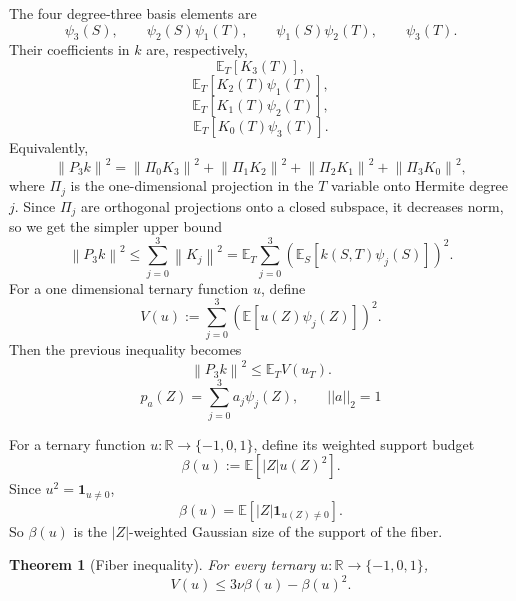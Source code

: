 \documentclass[11pt]{article}
\newtheorem{theorem}{Theorem}[section]
\newcommand{\R}{\mathbb R}
\newcommand{\E}{\mathbb E}
\newcommand{\norm}[1]{\left\|#1\right\|}
\newcommand{\one}{\mathbf 1}
\begin{document}
The four degree-three basis elements are
\[
        \psi_3(S),\qquad
        \psi_2(S)\psi_1(T),\qquad
        \psi_1(S)\psi_2(T),\qquad
        \psi_3(T).
\]
Their coefficients in $k$ are, respectively,
\[
        \E_T[K_3(T)],
\]
\[
        \E_T[K_2(T)\psi_1(T)],
\]
\[
        \E_T[K_1(T)\psi_2(T)],
\]
\[
        \E_T[K_0(T)\psi_3(T)].
\]
Equivalently,
\begin{equation}
        \norm{P_3k}^2
        =\norm{\Pi_0K_3}^2+
          \norm{\Pi_1K_2}^2+
          \norm{\Pi_2K_1}^2+
          \norm{\Pi_3K_0}^2,
        \tag{3}
\end{equation}
where $\Pi_j$ is the one-dimensional projection in the $T$ variable onto Hermite degree $j$. Since $\Pi_j$ are orthogonal projections onto a closed subspace, it decreases norm, so we get the simpler upper bound 
\[
        \norm{P_3k}^2
        \le \sum_{j=0}^3\norm{K_j}^2
        =\E_T\sum_{j=0}^3\left(\E_S[k(S,T)\psi_j(S)]\right)^2.
\]
For a one dimensional ternary function $u$, define
\[
        V(u):=\sum_{j=0}^3\left(\E[u(Z)\psi_j(Z)]\right)^2.
\]
Then the previous inequality becomes
\begin{equation}
        \boxed{\norm{P_3k}^2\le \E_T V(u_T).}
        \tag{4}
\end{equation}\[p_a(Z) = \sum\limits_{j=0}^3 a_j \psi_j(Z), \qquad ||a||_2 = 1\] 

For a ternary function $u:\R\to\{-1,0,1\}$, define its weighted support budget
\[
        \beta(u):=\E[|Z|u(Z)^2].
\]
Since $u^2=\one_{u\neq0}$,
\[
        \beta(u)=\E[|Z|\one_{u(Z)\neq0}].
\]
So $\beta(u)$ is the $|Z|$-weighted Gaussian size of the support of the fiber.

\begin{theorem}[Fiber inequality]
For every ternary $u:\R\to\{-1,0,1\}$,
\begin{equation}
        V(u)\le 3\nu\beta(u)-\beta(u)^2.
        \tag{FQ1}
\end{equation}
\end{theorem}
\end{document}
